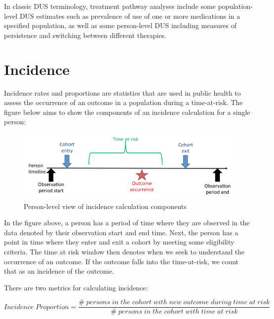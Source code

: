\documentclass[11pt]{book}
\theoremstyle{definition}
\theoremstyle{definition}
\theoremstyle{definition}
\theoremstyle{remark}
\begin{document}
In classic DUS terminology, treatment pathway analyses include some population-level DUS estimates such as prevalence of use of one or more medications in a specified population, as well as some person-level DUS including measures of persistence and switching between different therapies.

\hypertarget{incidence}{%
\section{Incidence}\label{incidence}}

Incidence rates and proportions are statistics that are used in public health to assess the occurrence of an outcome in a population during a time-at-risk. The figure below aims to show the components of an incidence calculation for a single person:

\begin{figure}

{\centering \includegraphics[width=1\linewidth]{images/Characterization/incidenceTimeline} 

}

\caption{Person-level view of incidence calculation components}\label{fig:incidenceTimeline}
\end{figure}

In the figure above, a person has a period of time where they are observed in the data denoted by their observation start and end time. Next, the person has a point in time where they enter and exit a cohort by meeting some eligibility criteria. The time at risk window then denotes when we seek to understand the occurrence of an outcome. If the outcome falls into the time-at-risk, we count that as an incidence of the outcome.

There are two metrics for calculating incidence:

\begin{equation} 
Incidence\;Proportion = \frac{\#\;persons\;in\;the\;cohort\;with\;new\;outcome\;during\;time\;at\;risk}{\#\;persons\;in\;the\;cohort\;with\;time\;at\;risk}
\end{equation}
\end{document}
